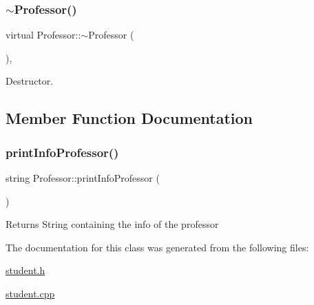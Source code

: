 \subsubsection{\texorpdfstring{$\sim$\+Professor()}{~Professor()}}
{\footnotesize\ttfamily virtual Professor\+::$\sim$\+Professor (\begin{DoxyParamCaption}{ }\end{DoxyParamCaption})\hspace{0.3cm}{\ttfamily [inline]}, {\ttfamily [virtual]}}



Destructor. 



\subsection{Member Function Documentation}
\mbox{\label{class_professor_ab82335224aa182146ec08b3f9cc4e2b4}} 
\subsubsection{\texorpdfstring{print\+Info\+Professor()}{printInfoProfessor()}}
{\footnotesize\ttfamily string Professor\+::print\+Info\+Professor (\begin{DoxyParamCaption}{ }\end{DoxyParamCaption})}

\begin{DoxyReturn}{Returns}
String containing the info of the professor 
\end{DoxyReturn}


The documentation for this class was generated from the following files\+:\begin{DoxyCompactItemize}
\item 
\hyperlink{student_8h}{student.\+h}\item 
\hyperlink{student_8cpp}{student.\+cpp}\end{DoxyCompactItemize}
